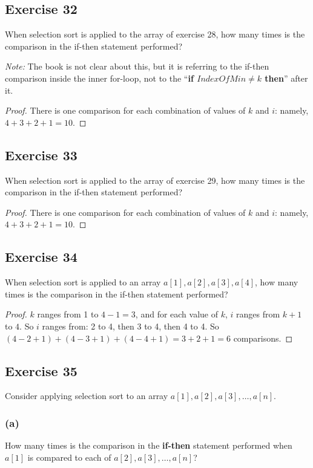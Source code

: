 \documentclass[14pt]{extarticle}
\begin{document}
\subsection{Exercise 32}
When selection sort is applied to the array of exercise 28, how many times is the comparison in the if-then statement 
performed?

{\it Note:} The book is not clear about this, but it is referring to the if-then comparison inside the inner for-loop,
not to the ``{\bf if \(IndexOfMin \neq k\) then}'' after it.

\begin{proof}
There is one comparison for each combination of values of \(k\) and \(i\): namely, \(4 + 3 + 2 + 1 = 10\).
\end{proof}

\subsection{Exercise 33}
When selection sort is applied to the array of exercise 29, how many times is the comparison in the if-then statement 
performed?

\begin{proof}
There is one comparison for each combination of values of \(k\) and \(i\): namely, \(4 + 3 + 2 + 1 = 10\).
\end{proof}

\subsection{Exercise 34}
When selection sort is applied to an array \(a[1], a[2], a[3], a[4]\), how many times is the comparison in the if-then 
statement performed?

\begin{proof}
\(k\) ranges from 1 to \(4-1=3\), and for each value of \(k\), \(i\) ranges from \(k+1\) to \(4\). So \(i\) ranges from: 
2 to 4, then 3 to 4, then 4 to 4. So \((4-2+1) + (4-3+1) + (4-4+1) = 3+2+1 = 6\) comparisons.
\end{proof}

\subsection{Exercise 35}
Consider applying selection sort to an array \(a[1], a[2], a[3], \ldots, a[n]\).

\subsubsection{(a)}
How many times is the comparison in the {\bf if-then} statement performed when \(a[1]\) is compared to each of 
\(a[2], a[3], \ldots, a[n]\)?
\end{document}
